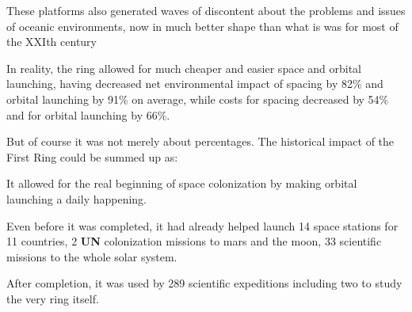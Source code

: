 \documentclass[]{article}
\begin{document}
	These platforms also generated waves of discontent about the problems and issues of oceanic environments, now in much better shape than what is was for most of the XXIth century
	
	
	
	In reality, the ring allowed for much cheaper and easier space and orbital launching, having decreased net environmental impact of spacing by 82\% and orbital launching by 91\% on average, while costs for spacing decreased by 54\% and for orbital launching by 66\%.  
	
	But of course it was not merely about percentages. The historical impact of the First Ring could be summed up as:
	
	\begin{center}
		It allowed for the real beginning of space colonization by making orbital launching a daily happening.  
	\end{center}
	
	Even before it was completed, it had already helped launch 14 space stations for 11 countries, 2 \textbf{UN} colonization missions to mars and the moon, 33 scientific missions to the whole solar system. 
	
    After completion, it was used by 289 scientific expeditions including two to study the very ring itself.	
	
\end{document}
